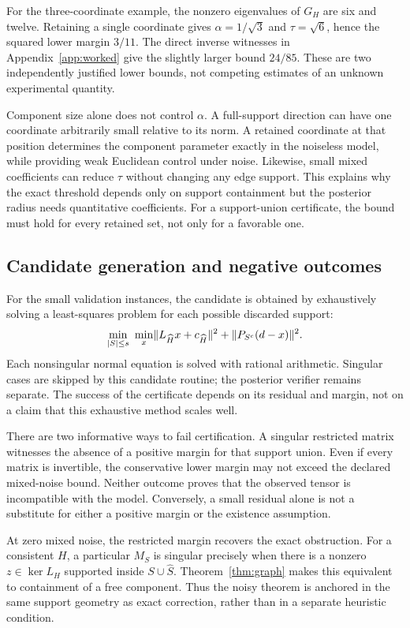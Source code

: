 For the three-coordinate example, the nonzero eigenvalues of $G_H$ are six and twelve. Retaining a single coordinate gives $\alpha=1/\sqrt3$ and $\tau=\sqrt6$, hence the squared lower margin $3/11$. The direct inverse witnesses in Appendix~\ref{app:worked} give the slightly larger bound $24/85$. These are two independently justified lower bounds, not competing estimates of an unknown experimental quantity.

Component size alone does not control $\alpha$. A full-support direction can have one coordinate arbitrarily small relative to its norm. A retained coordinate at that position determines the component parameter exactly in the noiseless model, while providing weak Euclidean control under noise. Likewise, small mixed coefficients can reduce $\tau$ without changing any edge support. This explains why the exact threshold depends only on support containment but the posterior radius needs quantitative coefficients. For a support-union certificate, the bound must hold for every retained set, not only for a favorable one.

\subsection{Candidate generation and negative outcomes}
For the small validation instances, the candidate is obtained by exhaustively solving a least-squares problem for each possible discarded support:
\begin{equation}\label{eq:trimmed-ls}
 \min_{|S|\le s}\ \min_x
 \lVert L_{\widehat H}x+c_{\widehat H}\rVert^2+\lVert P_{S^c}(d-x)\rVert^2.
\end{equation}
Each nonsingular normal equation is solved with rational arithmetic. Singular cases are skipped by this candidate routine; the posterior verifier remains separate. The success of the certificate depends on its residual and margin, not on a claim that this exhaustive method scales well.

There are two informative ways to fail certification. A singular restricted matrix witnesses the absence of a positive margin for that support union. Even if every matrix is invertible, the conservative lower margin may not exceed the declared mixed-noise bound. Neither outcome proves that the observed tensor is incompatible with the model. Conversely, a small residual alone is not a substitute for either a positive margin or the existence assumption.

At zero mixed noise, the restricted margin recovers the exact obstruction. For a consistent $H$, a particular $M_S$ is singular precisely when there is a nonzero $z\in\ker L_H$ supported inside $S\cup\widehat S$. Theorem~\ref{thm:graph} makes this equivalent to containment of a free component. Thus the noisy theorem is anchored in the same support geometry as exact correction, rather than in a separate heuristic condition.
